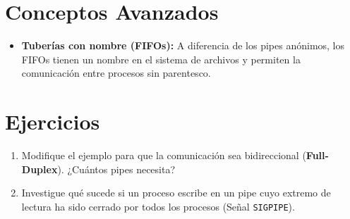 \documentclass[12pt,a4paper]{article}
\begin{document}
\section{Conceptos Avanzados}
\begin{itemize}
    \item \textbf{Tuberías con nombre (FIFOs):} A diferencia de los pipes anónimos, los FIFOs tienen un nombre en el sistema de archivos y permiten la comunicación entre procesos sin parentesco.
\end{itemize}

\section{Ejercicios}
\begin{enumerate}
    \item Modifique el ejemplo para que la comunicación sea bidireccional (\textbf{Full-Duplex}). ¿Cuántos pipes necesita?
    \item Investigue qué sucede si un proceso escribe en un pipe cuyo extremo de lectura ha sido cerrado por todos los procesos (Señal \texttt{SIGPIPE}).
\end{enumerate}
\end{document}
